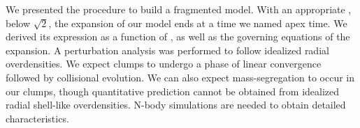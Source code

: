 We presented the procedure to build a \HubLem fragmented model. With an appropriate \tHub, below $\sqrt{2}$, the expansion of our model ends at a time we named apex time. We derived its expression as a function of \tHub, as well as the governing equations of the expansion. A perturbation analysis was performed to follow idealized radial overdensities. We expect clumps to undergo a phase of linear convergence followed by collisional evolution. We can also expect mass-segregation to occur in our clumps, though quantitative prediction cannot be obtained from idealized radial shell-like overdensities. N-body simulations are needed to obtain detailed characteristics.
















